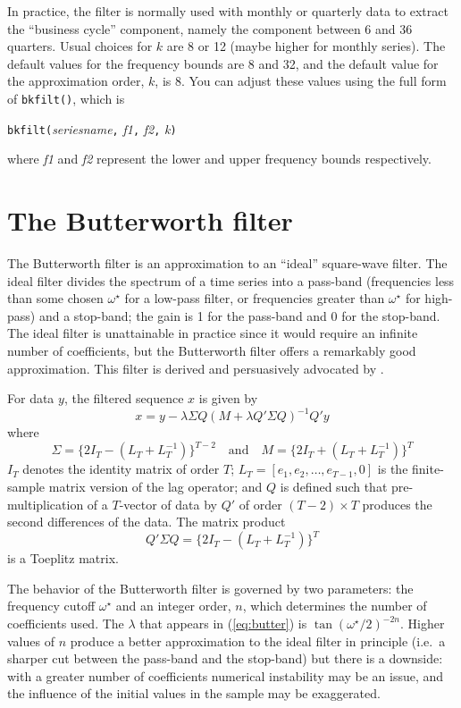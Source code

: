 In practice, the filter is normally used with monthly or quarterly
data to extract the ``business cycle'' component, namely the component
between 6 and 36 quarters. Usual choices for $k$ are 8 or 12 (maybe
higher for monthly series).  The default values for the frequency
bounds are 8 and 32, and the default value for the approximation
order, $k$, is 8. You can adjust these values using the full form
of \verb+bkfilt()+, which is

\texttt{bkfilt(}\textsl{seriesname}\texttt{,} \textsl{f1}\texttt{,} 
 \textsl{f2}\texttt{,} \textsl{k}\texttt{)}

where \textsl{f1} and \textsl{f2} represent the lower and upper
frequency bounds respectively.

\section{The Butterworth filter}
\label{sec:butterworth}

The Butterworth filter \citep{butterworth30} is an approximation to an
``ideal'' square-wave filter. The ideal filter divides the spectrum of
a time series into a pass-band (frequencies less than some chosen
$\omega^{\star}$ for a low-pass filter, or frequencies greater than
$\omega^{\star}$ for high-pass) and a stop-band; the gain is 1 for the
pass-band and 0 for the stop-band. The ideal filter is unattainable in
practice since it would require an infinite number of coefficients,
but the Butterworth filter offers a remarkably good
approximation. This filter is derived and persuasively advocated by
\cite{pollock2000}.

For data $y$, the filtered sequence $x$ is given by
%
\begin{equation}
\label{eq:butter}
x = y - \lambda \Sigma Q(M + \lambda Q'\Sigma Q)^{-1}Q'y
\end{equation}
%
where
\[
\Sigma = \{2I_T - (L_T +  L^{-1}_T)\}^{T-2}
\quad \mbox{and} \quad
M =   \{2I_T + (L_T +  L^{-1}_T)\}^{T}
\]
%
$I_T$ denotes the identity matrix of order $T$; $L_T = [e_1, e_2,
\ldots, e_{T-1}, 0]$ is the finite-sample matrix version of the lag
operator; and $Q$ is defined such that pre-multiplication of a
$T$-vector of data by $Q'$ of order $(T-2) \times T$ produces the
second differences of the data. The matrix product
\[
Q'\Sigma Q = \{2I_T - (L_T +  L^{-1}_T)\}^{T}
\]
is a Toeplitz matrix.

The behavior of the Butterworth filter is governed by two parameters:
the frequency cutoff $\omega^{\star}$ and an integer order, $n$, which
determines the number of coefficients used. The $\lambda$ that appears
in (\ref{eq:butter}) is $\tan(\omega^{\star}/2)^{-2n}$.  Higher
values of $n$ produce a better approximation to the ideal filter in
principle (i.e.\ a sharper cut between the pass-band and the
stop-band) but there is a downside: with a greater number of
coefficients numerical instability may be an issue, and the influence
of the initial values in the sample may be exaggerated.

